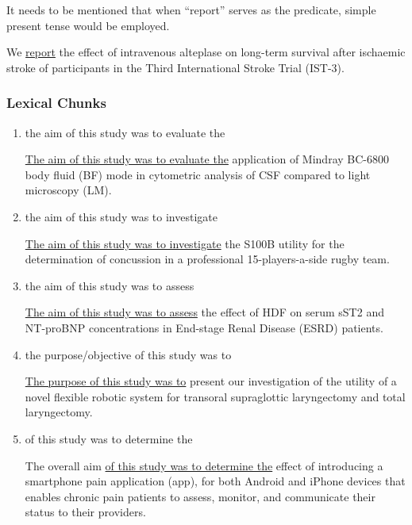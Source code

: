 \documentclass[a4paper]{ctexbook}
\begin{document}
    
    It needs to be mentioned that when ``report'' serves as the predicate, simple present tense would be employed.

    \begin{eg}{}
      We \uline{report} the effect of intravenous alteplase on long-term survival after ischaemic stroke of participants in the Third International Stroke Trial (IST-3).
    \end{eg}

    \subsubsection{Lexical Chunks}

    \begin{enumerate}
      \item the aim of this study was to evaluate the
      \begin{eg}{}
        \uline{The aim of this study was to evaluate the} application of Mindray BC-6800 body fluid (BF) mode in cytometric analysis of CSF compared to light microscopy (LM).
      \end{eg}

      \item the aim of this study was to investigate
      \begin{eg}{}
        \uline{The aim of this study was to investigate} the S100B utility for the determination of concussion in a professional 15-players-a-side rugby team.
      \end{eg}

      \item the aim of this study was to assess
      \begin{eg}{}
        \uline{The aim of this study was to assess} the effect of HDF on serum sST2 and NT-proBNP concentrations in End-stage Renal Disease (ESRD) patients.
      \end{eg}

      \item the purpose/objective of this study was to
      \begin{eg}{}
        \uline{The purpose of this study was to} present our investigation of the utility of a novel flexible robotic system for transoral supraglottic laryngectomy and total laryngectomy.
      \end{eg}

      \item of this study was to determine the
      \begin{eg}{}
        The overall aim \uline{of this study was to determine the} effect of introducing a smartphone pain application (app), for both Android and iPhone devices that enables chronic pain patients to assess, monitor, and communicate their status to their providers.
      \end{eg}


\end{enumerate}
\end{document}
